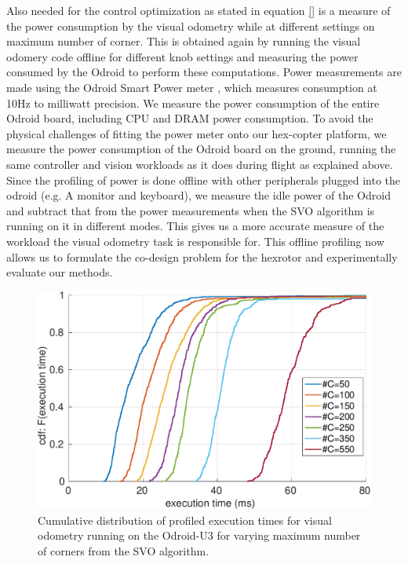 Also needed for the control optimization as stated in equation \ref{} is a measure of the power consumption by the visual odometry while at different settings on maximum number of corner. This is obtained again by running the visual odomery code offline for different knob settings and measuring the power consumed by the Odroid to perform these computations. Power measurements are made using the Odroid Smart Power meter \cite{OdroidSmartPower}, which measures consumption at 10Hz to milliwatt precision. We measure the power consumption of the entire Odroid board, including CPU and DRAM power consumption. To avoid the physical challenges of fitting the power meter onto our hex-copter platform, we measure the power consumption of the Odroid board on the ground, running the same controller and vision workloads as it does during flight as explained above. Since the profiling of power is done offline with other peripherals plugged into the odroid (e.g. A monitor and keyboard), we measure the idle power of the Odroid and subtract that from the power measurements when the SVO algorithm is running on it in different modes. This gives us a more accurate measure of the workload the visual odometry task is responsible for. This offline profiling now allows us to formulate the co-design problem for the hexrotor and experimentally evaluate our methods.


\begin{figure}[htbp]
  \centering
  \includegraphics[width=0.9\columnwidth]{figures/time_ecdf_millisec.pdf}
  \caption{Cumulative distribution of profiled execution times for visual odometry running on the Odroid-U3 for varying maximum number of corners from the SVO algorithm.}
  \label{fig:time_ecdf}
\end{figure}


